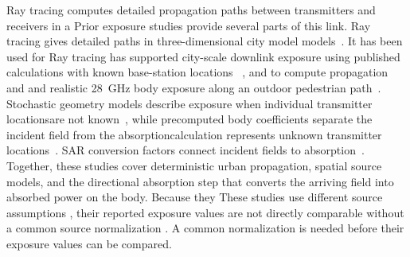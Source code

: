 \documentclass{IEEEoj} %
\providecommand{\DIFadd}[1]{{\protect\color{blue} \sf #1}} %
\providecommand{\DIFdel}[1]{{\protect\color{red} \scriptsize #1}} %
\providecommand{\DIFaddbegin}{} %
\providecommand{\DIFaddend}{} %
\providecommand{\DIFdelbegin}{} %
\providecommand{\DIFdelend}{} %
\begin{document}
\DIFdelbegin \DIFdel{Ray tracing computes detailed propagation paths between transmitters and
receivers in a }\DIFdelend \DIFaddbegin \DIFadd{Prior exposure studies provide several parts of this link. Ray tracing gives
detailed paths in }\DIFaddend three-dimensional city \DIFdelbegin \DIFdel{model}\DIFdelend \DIFaddbegin \DIFadd{models}\DIFaddend ~\cite{sionna}. \DIFdelbegin \DIFdel{It has been used for
}\DIFdelend \DIFaddbegin \DIFadd{Ray tracing has supported
}\DIFaddend city-scale downlink exposure \DIFdelbegin \DIFdel{using published }\DIFdelend \DIFaddbegin \DIFadd{calculations with known }\DIFaddend base-station
locations~\cite{leeman} \DIFdelbegin \DIFdel{, and to compute propagation and }\DIFdelend \DIFaddbegin \DIFadd{and realistic 28~GHz }\DIFaddend body exposure along an outdoor
\DIFdelbegin \DIFdel{pedestrian }\DIFdelend path~\cite{wydaeghe2026}. Stochastic geometry \DIFdelbegin \DIFdel{models
describe exposure when individual transmitter
locationsare not
known~\cite{wiame}, while precomputed body coefficients separate the incident field from the absorptioncalculation}\DIFdelend \DIFaddbegin \DIFadd{represents unknown transmitter
locations~\cite{wiame}. SAR conversion factors connect incident fields to
absorption}\DIFaddend ~\cite{varsier}. \DIFdelbegin \DIFdel{Together, these studies cover deterministic urban propagation, spatial source models, and the
directional absorption step that converts the arriving field into absorbed power
on the body. Because they }\DIFdelend \DIFaddbegin \DIFadd{These studies }\DIFaddend use different source assumptions\DIFdelbegin \DIFdel{, their reported
exposure values are not directly comparable without a common source
normalization}\DIFdelend \DIFaddbegin \DIFadd{.
A common normalization is needed before their exposure values can be compared}\DIFaddend .
\end{document}
